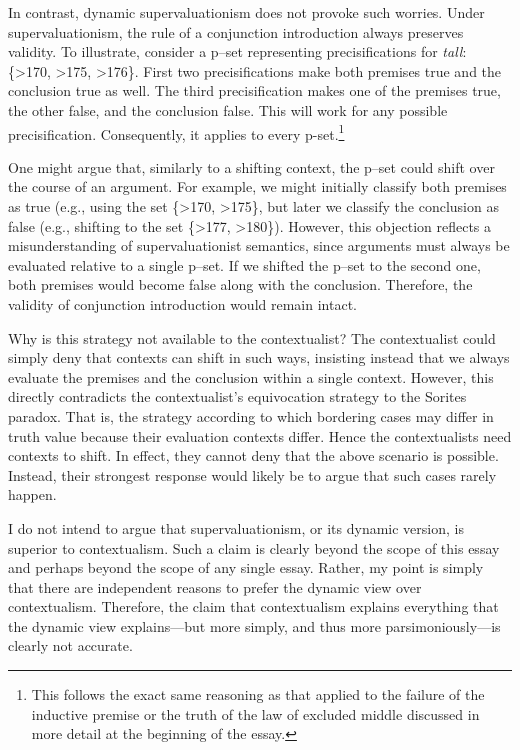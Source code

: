 In contrast, dynamic supervaluationism does not provoke such worries.
Under supervaluationism, the rule of a conjunction introduction always
preserves validity. To illustrate, consider a p--set representing
precisifications for \emph{tall}: \{\textgreater170, \textgreater175,
\textgreater176\}. First two precisifications make both premises true
and the conclusion true as well. The third precisification makes one of
the premises true, the other false, and the conclusion false. This will
work for any possible precisification. Consequently, it applies to every
p-set.\footnote{This follows the exact same reasoning as that applied to
  the failure of the inductive premise or the truth of the law of
  excluded middle discussed in more detail at the beginning of the
  essay.}

One might argue that, similarly to a shifting context, the p--set could
shift over the course of an argument. For example, we might initially
classify both premises as true (e.g., using the set \{\textgreater170,
\textgreater175\}, but later we classify the conclusion as false (e.g.,
shifting to the set \{\textgreater177, \textgreater180\}). However, this
objection reflects a misunderstanding of supervaluationist semantics,
since arguments must always be evaluated relative to a single p--set. If
we shifted the p--set to the second one, both premises would become false
along with the conclusion. Therefore, the validity of conjunction
introduction would remain intact.

Why is this strategy not available to the contextualist? The
contextualist could simply deny that contexts can shift in such ways,
insisting instead that we always evaluate the premises and the
conclusion within a single context. However, this directly contradicts
the contextualist's equivocation strategy to the Sorites paradox. That
is, the strategy according to which bordering cases may differ in truth
value because their evaluation contexts differ. Hence the contextualists
need contexts to shift. In effect, they cannot deny that the above
scenario is possible. Instead, their strongest response would likely be
to argue that such cases rarely happen.

I do not intend to argue that supervaluationism, or its dynamic version,
is superior to contextualism. Such a claim is clearly beyond the scope
of this essay and perhaps beyond the scope of any single essay. Rather,
my point is simply that there are independent reasons to prefer the
dynamic view over contextualism. Therefore, the claim that contextualism
explains everything that the dynamic view explains---but more simply,
and thus more parsimoniously---is clearly not accurate.

